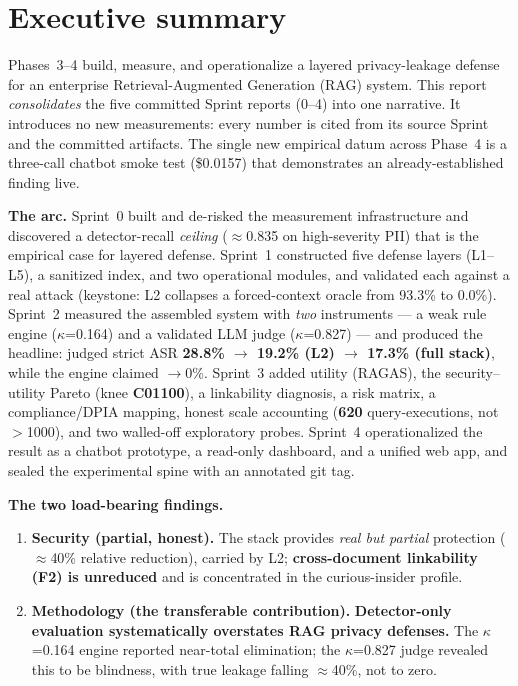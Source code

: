 \documentclass[11pt,a4paper]{article}
\newcommand{\kp}{\ensuremath{\kappa}}
\begin{document}
\tableofcontents
\newpage

\section{Executive summary}

\begin{summarybox}
Phases~3--4 build, measure, and operationalize a layered privacy-leakage defense for an enterprise
Retrieval-Augmented Generation (RAG) system. This report \emph{consolidates} the five committed
Sprint reports (0--4) into one narrative. It introduces no new measurements: every number is cited
from its source Sprint and the committed artifacts. The single new empirical datum across Phase~4 is
a three-call chatbot smoke test (\$0.0157) that demonstrates an already-established finding live.
\end{summarybox}

\noindent\textbf{The arc.} Sprint~0 built and de-risked the measurement infrastructure and discovered
a detector-recall \emph{ceiling} ($\approx$0.835 on high-severity PII) that is the empirical case for
layered defense. Sprint~1 constructed five defense layers (L1--L5), a sanitized index, and two
operational modules, and validated each against a real attack (keystone: L2 collapses a forced-context
oracle from 93.3\% to 0.0\%). Sprint~2 measured the assembled system with \emph{two} instruments --- a
weak rule engine (\kp{}=0.164) and a validated LLM judge (\kp{}=0.827) --- and produced the headline:
judged strict ASR \textbf{28.8\% $\to$ 19.2\% (L2) $\to$ 17.3\% (full stack)}, while the engine claimed
$\to$0\%. Sprint~3 added utility (RAGAS), the security--utility Pareto (knee \textbf{C01100}), a
linkability diagnosis, a risk matrix, a compliance/DPIA mapping, honest scale accounting (\textbf{620}
query-executions, not $>$1000), and two walled-off exploratory probes. Sprint~4 operationalized the
result as a chatbot prototype, a read-only dashboard, and a unified web app, and sealed the
experimental spine with an annotated git tag.

\noindent\textbf{The two load-bearing findings.}
\begin{enumerate}[leftmargin=1.4em,itemsep=1pt]
\item \textbf{Security (partial, honest).} The stack provides \emph{real but partial} protection
($\approx$40\% relative reduction), carried by L2; \textbf{cross-document linkability (F2) is
unreduced} and is concentrated in the curious-insider profile.
\item \textbf{Methodology (the transferable contribution).} \textbf{Detector-only evaluation
systematically overstates RAG privacy defenses.} The \kp{}=0.164 engine reported near-total
elimination; the \kp{}=0.827 judge revealed this to be blindness, with true leakage falling
$\approx$40\%, not to zero.
\end{enumerate}
\end{document}
